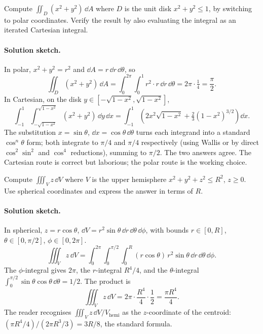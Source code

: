 \begin{exercise}
Compute $\iint_{D} (x^{2} + y^{2}) \,\dd A$ where $D$ is the unit
disk $x^{2} + y^{2} \leq 1$, by switching to polar coordinates.
Verify the result by also evaluating the integral as an iterated
Cartesian integral.

\paragraph{Solution sketch.} In polar, $x^{2} + y^{2} = r^{2}$ and
$\dd A = r\,\dd r\,\dd\theta$, so
\[
\iint_{D}(x^{2} + y^{2})\,\dd A = \int_{0}^{2\pi}\!\int_{0}^{1}
r^{2} \cdot r \,\dd r\,\dd\theta = 2\pi \cdot \tfrac{1}{4} =
\frac{\pi}{2}.
\]
In Cartesian, on the disk $y \in [-\sqrt{1 - x^{2}}, \sqrt{1 -
x^{2}}]$,
\[
\int_{-1}^{1}\!\int_{-\sqrt{1 - x^{2}}}^{\sqrt{1 - x^{2}}}
(x^{2} + y^{2})\,\dd y\,\dd x =
\int_{-1}^{1}\!\left(2 x^{2}\sqrt{1 - x^{2}} +
\tfrac{2}{3}(1 - x^{2})^{3/2}\right)\dd x.
\]
The substitution $x = \sin\theta$, $\dd x = \cos\theta\,\dd\theta$
turns each integrand into a standard $\cos^{n}\theta$ form; both
integrate to $\pi/4$ and $\pi/4$ respectively (using Wallis or by
direct $\cos^{2}\sin^{2}$ and $\cos^{4}$ reductions), summing to
$\pi/2$. The two answers agree. The Cartesian route is correct but
laborious; the polar route is the working choice.
\end{exercise}

\begin{exercise}
Compute $\iiint_{V} z \,\dd V$ where $V$ is the upper hemisphere
$x^{2} + y^{2} + z^{2} \leq R^{2}$, $z \geq 0$. Use spherical
coordinates and express the answer in terms of $R$.

\paragraph{Solution sketch.} In spherical, $z = r\cos\theta$,
$\dd V = r^{2}\sin\theta\,\dd r\,\dd\theta\,\dd\phi$, with bounds
$r \in [0, R]$, $\theta \in [0, \pi/2]$, $\phi \in [0, 2\pi]$.
\[
\iiint_{V} z\,\dd V = \int_{0}^{2\pi}\!\int_{0}^{\pi/2}\!\int_{0}^{R}
(r\cos\theta)\,r^{2}\sin\theta\,\dd r\,\dd\theta\,\dd\phi.
\]
The $\phi$-integral gives $2\pi$, the $r$-integral $R^{4}/4$, and
the $\theta$-integral $\int_{0}^{\pi/2}\sin\theta\cos\theta\,
\dd\theta = 1/2$. The product is
\[
\iiint_{V} z\,\dd V = 2\pi \cdot \frac{R^{4}}{4} \cdot \frac{1}{2}
= \frac{\pi R^{4}}{4}.
\]
The reader recognises $\iiint_{V} z\,\dd V / V_{\text{hemi}}$ as
the $z$-coordinate of the centroid: $(\pi R^{4}/4) /
(2\pi R^{3}/3) = 3 R / 8$, the standard formula.
\end{exercise}

